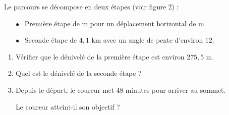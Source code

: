 Le parcours se décompose en deux étapes (voir figure 2) :

\medskip

\setlength\parindent{12mm}
\begin{itemize}
\item[$\bullet~~$]Première étape de  m pour un déplacement horizontal de  m.
\item[$\bullet~~$]Seconde étape de $4,1$ km avec un angle de pente d'environ $12$\degres.
\end{itemize}
\setlength\parindent{0mm}

\bigskip

\begin{enumerate}
\item Vérifier que le dénivelé de la première étape est environ $275,5$ m.
\item Quel est le dénivelé de la seconde étape ?
\item Depuis le départ, le coureur met $48$ minutes pour arriver au sommet.

Le coureur atteint-il son objectif ?
\end{enumerate}

